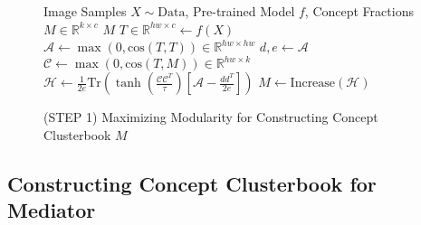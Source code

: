 \documentclass{article} \usepackage{iclr2024_conference,times}
\begin{document}
\begin{figure}[t!]
\vspace{-12mm}
\begin{algorithm}[H]
\caption{(STEP 1) Maximizing Modularity for Constructing Concept Clusterbook $M$}
\begin{algorithmic}[1]
\Require Image Samples $X\sim \text{Data}$, Pre-trained Model $f$, Concept Fractions $M\in\mathbb{R}^{k\times c}$
\State {} $M$
\State $T\in\mathbb{R}^{hw\times c} \gets f(X)$ 
\State $\mathcal{A}\gets\max(0, \text{cos}(T, T))\in\mathbb{R}^{hw\times hw}$ 
\State $d, e\gets\mathcal{A}$ 
\State $\mathcal{C}\gets\max(0, \text{cos}(T, M))\in\mathbb{R}^{hw\times k}$ 
\State $\mathcal{H}\gets \frac{1}{2e}\text{Tr}\left(\tanh\left(\frac{\mathcal{C}\mathcal{C}^T}{\tau}\right)\left[\mathcal{A}-\frac{dd^T}{2e}\right]\right)$ 
\State $M \gets \text{Increase}(\mathcal{H})$ 
\EndFor
\end{algorithmic}
\label{alg:mediator}
\end{algorithm}
\vspace{-7mm}
\end{figure} 
\subsection{Constructing Concept Clusterbook for Mediator}
\label{sec:3.2}
\end{document}
